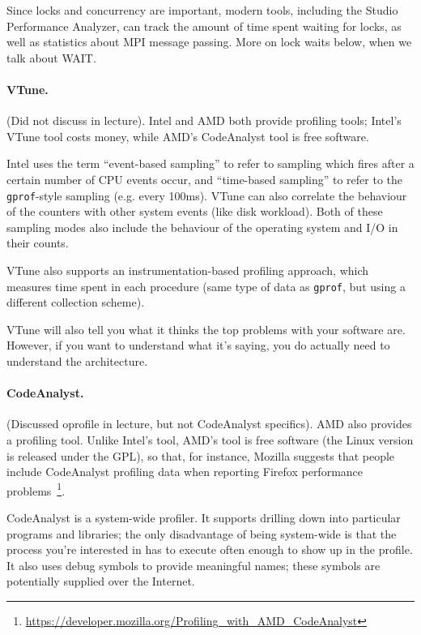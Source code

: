 \documentclass[11pt]{article}
\begin{document}
Since locks and concurrency are important, modern tools, including the
Studio Performance Analyzer, can track the amount of time spent
waiting for locks, as well as statistics about MPI message
passing. More on lock waits below, when we talk about WAIT.

\paragraph{VTune.} (Did not discuss in lecture). Intel and AMD both provide profiling
tools; Intel's VTune tool costs money, while AMD's CodeAnalyst tool is
free software.

Intel uses the term ``event-based sampling'' to refer to sampling 
which fires after a certain number of CPU events occur, and ``time-based
sampling'' to refer to the {\tt gprof}-style sampling (e.g. every 100ms).
VTune can also correlate the behaviour of the counters with other
system events (like disk workload). Both of these sampling modes
also include the behaviour of the operating system and I/O in their
counts.

VTune also supports an instrumentation-based profiling approach,
which measures time spent in each procedure (same type of
data as {\tt gprof}, but using a different collection scheme).

VTune will also tell you what it thinks the top problems with your
software are. However, if you want to understand what it's saying,
you do actually need to understand the architecture.

\paragraph{CodeAnalyst.} (Discussed oprofile in lecture, but not CodeAnalyst
specifics).
AMD also provides a profiling tool. Unlike Intel's tool, AMD's tool is
free software (the Linux version is released under the GPL), so that,
for instance, Mozilla suggests that people include CodeAnalyst
profiling data when reporting Firefox performance
problems~\footnote{\url{https://developer.mozilla.org/Profiling_with_AMD_CodeAnalyst}}.

CodeAnalyst is a system-wide profiler. It supports drilling down into
particular programs and libraries; the only disadvantage of being
system-wide is that the process you're interested in has to execute
often enough to show up in the profile. It also uses debug symbols to
provide meaningful names; these symbols are potentially supplied over
the Internet.
\end{document}
